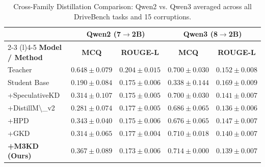 \begin{table}[t]
\centering
\caption{Cross-Family Distillation Comparison: Qwen2 vs. Qwen3 averaged across all DriveBench tasks and 15 corruptions.}
\label{tab:qwen2_vs_qwen3_distillation_summary}
\footnotesize
\setlength{\tabcolsep}{3pt}
\renewcommand{\arraystretch}{1.15}
\begin{tabular}{l cc | cc}
\toprule
 & \multicolumn{2}{c}{\textbf{Qwen2 (7$\rightarrow$2B)}} & \multicolumn{2}{c}{\textbf{Qwen3 (8$\rightarrow$2B)}} \\
\cmidrule(lr){2-3} \cmidrule(l){4-5}
\textbf{Model / Method} & \textbf{MCQ} & \textbf{ROUGE-L} & \textbf{MCQ} & \textbf{ROUGE-L} \\
\midrule
\rowcolor{black!4} Teacher & $0.648 \pm 0.079$ & $0.204 \pm 0.015$ & $0.700 \pm 0.030$ & $0.152 \pm 0.008$ \\
\rowcolor{black!4} Student Base & $0.190 \pm 0.084$ & $0.175 \pm 0.006$ & $0.338 \pm 0.144$ & $0.169 \pm 0.009$ \\
\midrule
+SpeculativeKD & $0.314 \pm 0.107$ & $0.175 \pm 0.005$ & $0.700 \pm 0.030$ & $0.141 \pm 0.007$ \\
+DistillM\textbackslash{}\_v2 & $0.281 \pm 0.074$ & $0.177 \pm 0.005$ & $0.686 \pm 0.065$ & $0.136 \pm 0.006$ \\
+HPD & $0.343 \pm 0.040$ & $0.175 \pm 0.006$ & $0.676 \pm 0.065$ & $0.147 \pm 0.007$ \\
+GKD & $0.314 \pm 0.065$ & $0.177 \pm 0.004$ & $0.710 \pm 0.018$ & $0.140 \pm 0.007$ \\
\midrule
\textbf{+M3KD (Ours)} & \textbf{$0.367 \pm 0.089$} & \textbf{$0.173 \pm 0.006$} & \textbf{$0.714 \pm 0.000$} & \textbf{$0.139 \pm 0.007$} \\
\bottomrule
\end{tabular}
\end{table}

